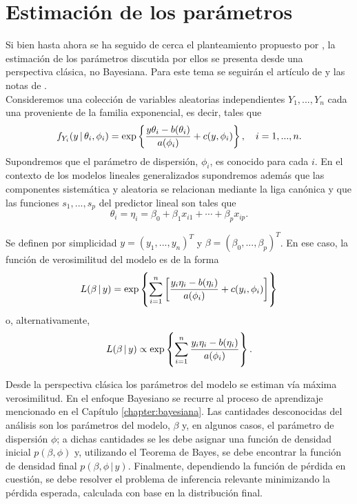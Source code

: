 \section{Estimación de los parámetros}

Si bien hasta ahora se ha seguido de cerca el planteamiento propuesto por \cite{nelder_glm}, la estimación de los parámetros discutida por ellos se presenta desde una perspectiva clásica, no Bayesiana. Para este tema se seguirán el artículo de \cite{glm_bayesian_view} y las notas de \cite{notas_glm_lnieto}. \\


Consideremos una colección de variables aleatorias independientes $Y_1, ..., Y_n$ cada una proveniente de la familia exponencial, es decir, tales que
\begin{equation*}
	f_{Y_i} (y \, | \, \theta_i, \phi_i ) = \mathrm{exp} \left\{ \frac{y\theta_i - b(\theta_i)}{a(\phi_i)} + c(y, \phi_i) \right\}, \quad i=1,...,n.
\end{equation*}
Supondremos que el parámetro de dispersión, $\phi_i$, es conocido para cada $i$. En el contexto de los modelos lineales generalizados supondremos además que las componentes sistemática y aleatoria se relacionan mediante la liga canónica y que las funciones $s_1, ..., s_p$ del predictor lineal son tales que
\begin{equation*}
	\theta_i = \eta_i = \beta_0 + \beta_1 x_{i1} + \cdots + \beta_p x_{ip}.
\end{equation*}

Se definen por simplicidad $y = (y_1, ..., y_n)^T$ y $\beta = (\beta_0, ..., \beta_p)^T$. En ese caso, la función de verosimilitud del modelo es de la forma
\begin{equation} \label{glm_verosimilitud_0}
	L( \beta \, | \, y ) = \mathrm{exp} \left\{ \sum_{i=1}^{n} \left[ \frac{y_i\eta_i - b(\eta_i)}{a(\phi_i)} + c(y_i, \phi_i) \right] \right\}
\end{equation}
o, alternativamente,
\begin{equation} \label{glm_verosimilitud}
	L( \beta \, | \, y ) \propto \mathrm{exp} \left\{ \sum_{i=1}^{n} \frac{y_i\eta_i - b(\eta_i)}{a(\phi_i)} \right\}.
\end{equation}

Desde la perspectiva clásica los parámetros del modelo se estiman vía máxima verosimilitud. En el enfoque Bayesiano se recurre al proceso de aprendizaje mencionado en el Capítulo \ref{chapter:bayesiana}. Las cantidades desconocidas del análisis son los parámetros del modelo, $\beta$ y, en algunos casos, el parámetro de dispersión $\phi$; a dichas cantidades se les debe asignar una función de densidad inicial $p(\beta, \phi)$ y, utilizando el Teorema de Bayes, se debe encontrar la función de densidad final $p(\beta, \phi \, | \, y)$. Finalmente, dependiendo la función de pérdida en cuestión, se debe resolver el problema de inferencia relevante minimizando la pérdida esperada, calculada con base en la distribución final. \\




